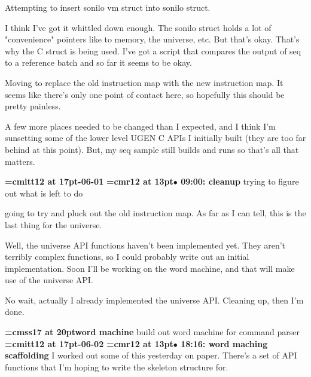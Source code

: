 Attempting to insert sonilo vm struct into sonilo struct.
\par

I think I've got it whittled down enough. The sonilo struct holds a lot of "convenience" pointers like to memory, the universe, etc. But that's okay. That's why the C struct is being used. I've got a script that compares the output of seq to a reference batch and so far it seems to be okay.
\par

Moving to replace the old instruction map with the new instruction map. It seems like there's only one point of contact here, so hopefully this should be pretty painless.
\par

A few more places needed to be changed than I expected, and I think I'm sunsetting some of the lower level UGEN C APIs I initially built (they are too far behind at this point). But, my seq sample still builds and runs so that's all that matters.
\par

{\medskip\noindent\bf\font\titlefont=cmitt12 at 17pt-06-01}\medskip
{\smallskip\noindent\bf\font\titlefont=cmr12 at 13pt\titlefont $\bullet$ 09:00: cleanup}\smallskip
trying to figure out what is left to do
\par

going to try and pluck out the old instruction map. As far as I can tell, this is the last thing for the universe.
\par

Well, the universe API functions haven't been implemented yet. They aren't terribly complex functions, so I could probably write out an initial implementation. Soon I'll be working on the word machine, and that will make use of the universe API.
\par

No wait, actually I already implemented the universe API. Cleaning up, then I'm done.
\par

{\medskip\noindent\bf\font\titlefont=cmss17 at 20pt\titlefont word machine}\medskip
build out word machine for command parser
{\medskip\noindent\bf\font\titlefont=cmitt12 at 17pt-06-02}\medskip
{\smallskip\noindent\bf\font\titlefont=cmr12 at 13pt\titlefont $\bullet$ 18:16: word maching scaffolding}\smallskip
I worked out some of this yesterday on paper. There's a set of API functions that I'm hoping to write the skeleton structure for.
\par


